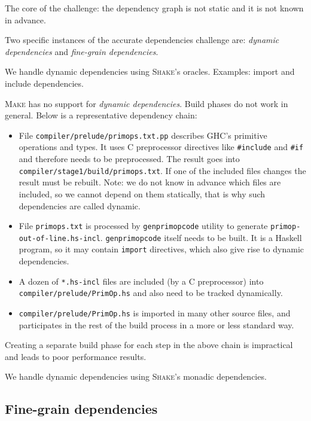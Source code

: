 The core of the challenge: the dependency graph is not static and it is not
known in advance.

Two specific instances of the accurate dependencies challenge are: \emph{dynamic
dependencies} and \emph{fine-grain dependencies}.

We handle dynamic dependencies using \textsc{Shake}'s oracles. Examples: import
and include dependencies.

\textsc{Make} has no support for \emph{dynamic dependencies}. Build
phases do not work in general. Below is a representative dependency chain:



\begin{itemize}
  \item File \texttt{compiler/prelude/primops.txt.pp} describes GHC’s primitive
  operations and types. It uses C preprocessor directives like
  \texttt{\#include} and \texttt{\#if} and therefore needs to be preprocessed.
  The result goes into \texttt{compiler/stage1/build/primops.txt}. If one of the
  included files changes the result must be rebuilt. Note: we do not know in
  advance which files are included, so we cannot depend on them statically,
  that is why such dependencies are called dynamic.
  \item File \texttt{primops.txt} is processed by \texttt{genprimopcode} utility
  to generate \texttt{primop-out-of-line.hs-incl}. \texttt{genprimopcode} itself
  needs to be built. It is a Haskell program, so it may contain \texttt{import}
  directives, which also give rise to dynamic dependencies.
  \item A dozen of \texttt{*.hs-incl} files are included (by a C preprocessor)
  into \texttt{compiler/prelude/PrimOp.hs} and also need to be tracked
  dynamically.
  \item \texttt{compiler/prelude/PrimOp.hs} is imported in many other source
  files, and participates in the rest of the build process in a more or less
  standard way.
\end{itemize}

\noindent Creating a separate build phase for each step in the above chain is
impractical and leads to poor performance results.

We handle dynamic dependencies using \textsc{Shake}'s monadic dependencies.

\subsection{Fine-grain dependencies}

